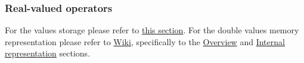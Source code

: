 \subsubsection{Real-valued operators}


\vspace{0.5cm}

For the  values storage please refer to
\hyperlink{types:two_words_storage}{this section}.
For the double values memory representation please refer to
\href{https://en.wikipedia.org/wiki/Floating-point_arithmetic}{Wiki},
specifically to the
\href{https://en.wikipedia.org/wiki/Floating-point_arithmetic#Floating-point_numbers}
{Overview} and
\href{https://en.wikipedia.org/wiki/Floating-point_arithmetic#Internal_representation}
{Internal representation} sections.

\vspace{-0.35cm}
\paragraph{}\

